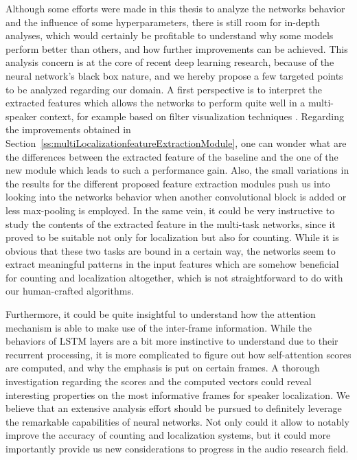 Although some efforts were made in this thesis to analyze the networks behavior and the influence of some hyperparameters, there is still room for in-depth analyses, which would certainly be profitable to understand why some models perform better than others, and how further improvements can be achieved. This analysis concern is at the core of recent deep learning research, because of the neural network's black box nature, and we hereby propose a few targeted points to be analyzed regarding our domain. A first perspective is to interpret the extracted features which allows the networks to perform quite well in a multi-speaker context, for example based on filter visualization techniques \cite{chollet_deep_2017,bach_pixel-wise_2015}. Regarding the improvements obtained in Section~\ref{ss:multiLocalizationfeatureExtractionModule}, one can wonder what are the differences between the extracted feature of the baseline and the one of the new module which leads to such a performance gain. Also, the small variations in the results for the different proposed feature extraction modules push us into looking into the networks behavior when another convolutional block is added or less max-pooling is employed. In the same vein, it could be very instructive to study the contents of the extracted feature in the multi-task networks, since it proved to be suitable not only for localization but also for counting. While it is obvious that these two tasks are bound in a certain way, the networks seem to extract meaningful patterns in the input features which are somehow beneficial for counting and localization altogether, which is not straightforward to do with our human-crafted algorithms.

Furthermore, it could be quite insightful to understand how the attention mechanism is able to make use of the inter-frame information. While the behaviors of LSTM layers are a bit more instinctive to understand due to their recurrent processing, it is more complicated to figure out how self-attention scores are computed, and why the emphasis is put on certain frames. A thorough investigation regarding the scores and the computed vectors could reveal interesting properties on the most informative frames for speaker localization. 
We believe that an extensive analysis effort should be pursued to definitely leverage the remarkable capabilities of neural networks. Not only could it allow to notably improve the accuracy of counting and localization systems, but it could more importantly provide us new considerations to progress in the audio research field.

